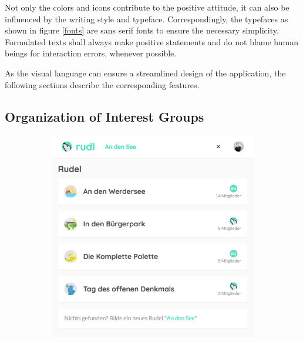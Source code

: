 \documentclass[12pt,numbers=noenddot,parskip,bibliography=totocnumbered,listof=totocnumbered,draft]{scrreprt}
\begin{document}
Not only the colors and icons contribute to the positive attitude, it can also be influenced by the writing style and typeface. Correspondingly, the typefaces as shown in figure \ref{fonts} are sans serif fonts to ensure the necessary simplicity. Formulated texts shall always make positive statements and do not blame human beings for interaction errors, whenever possible.

As the visual language can ensure a streamlined design of the application, the following sections describe the corresponding features.

\subsection{Organization of Interest Groups}
\begin{figure}
\begin{subfigure}[t]{0.45\textwidth}%
\centering
\includegraphics[width=\linewidth]{searchinterestgroup.png}
\caption{}
\label{searchinterestgroup}
\end{subfigure}%
\hfill
\begin{subfigure}[t]{0.45\textwidth}%
\centering

\end{subfigure}
\end{figure}
\end{document}

